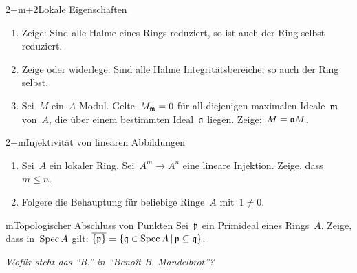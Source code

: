 \documentclass{uebblatt}
\begin{document}
\begin{aufgabe}{2+m+2}{Lokale Eigenschaften}
\begin{enumerate}
\item Zeige: Sind alle Halme eines Rings reduziert, so ist auch der Ring selbst
reduziert.
\item Zeige oder widerlege: Sind alle Halme Integritätsbereiche, so
auch der Ring selbst.
\item Sei~$M$ ein~$A$-Modul. Gelte~$M_{\mathfrak{m}} = 0$ für all diejenigen maximalen
Ideale~$\mathfrak{m}$ von~$A$, die über einem bestimmten Ideal~$\mathfrak{a}$ liegen. Zeige:~$M
= \mathfrak{a} M$.
\end{enumerate}
\end{aufgabe}

\begin{aufgabe}{2+m}{Injektivität von linearen Abbildungen}
\begin{enumerate}
\item Sei~$A$ ein lokaler Ring. Sei~$A^m \to A^n$ eine lineare Injektion.
Zeige, dass~$m \leq n$.
\item Folgere die Behauptung für beliebige Ringe~$A$ mit~$1 \neq 0$.
\end{enumerate}
\end{aufgabe}

\begin{aufgabe}{m}{Topologischer Abschluss von Punkten}
Sei~$\mathfrak{p}$ ein Primideal eines Rings~$A$. Zeige, dass in~$\operatorname{Spec} A$ gilt:
$\overline{\{\mathfrak{p}\}} = \{ \mathfrak{q} \in \operatorname{Spec} A \,|\, \mathfrak{p} \subseteq \mathfrak{q} \}$.
\end{aufgabe}

\centering
\emph{Wofür steht das "`B."' in "`Benoît B. Mandelbrot"'?}
\end{document}

